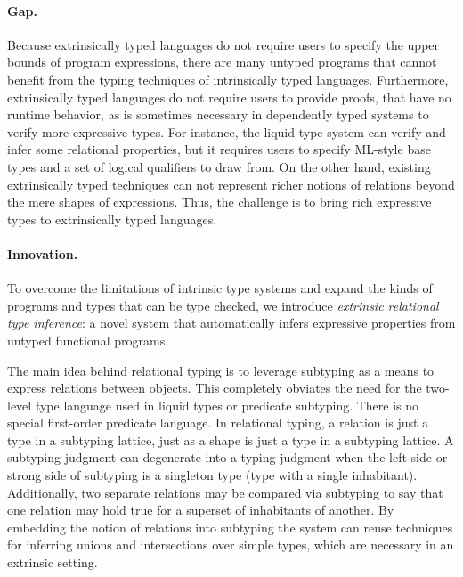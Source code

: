 \documentclass[acmsmall]{acmart}
\theoremstyle{definition}
\begin{document}
\paragraph{Gap.} 
Because extrinsically typed languages do not require users to specify the upper bounds of program expressions,
there are many untyped programs that cannot benefit from the typing techniques of 
intrinsically typed languages. Furthermore, extrinsically typed languages do not require users to provide proofs,
that have no runtime behavior, as is sometimes necessary in dependently typed systems to verify more expressive types.   
For instance, the liquid type system \cite{} can verify and infer some relational properties, 
but it requires users to specify ML-style base types and a set of logical qualifiers to draw from.
On the other hand, existing extrinsically typed techniques can not represent richer notions of relations 
beyond the mere shapes of expressions.
Thus, the challenge is to bring rich expressive types to extrinsically typed languages.

\paragraph{Innovation.} 
To overcome the limitations of intrinsic type systems and expand the kinds of programs and types that can be type checked, we introduce \textit{extrinsic relational type inference}: 
a novel system that automatically infers expressive properties from untyped functional programs. 

The main idea behind relational typing is to leverage subtyping as a means to express relations
between objects. This completely obviates the need for the two-level type language
used in liquid types or predicate subtyping. There is no special first-order predicate language. 
In relational typing, a relation is just a type in a subtyping lattice, just as a shape is just  
a type in a subtyping lattice. A subtyping judgment can degenerate into a typing judgment
when the left side or strong side of subtyping is a singleton type (type with a single inhabitant).
Additionally, two separate relations may be compared via subtyping to say that one relation may hold true for a superset of inhabitants 
of another.
By embedding the notion of relations into subtyping the system can reuse techniques for inferring unions and
intersections over simple types, which are necessary in an extrinsic setting. 
\end{document}
